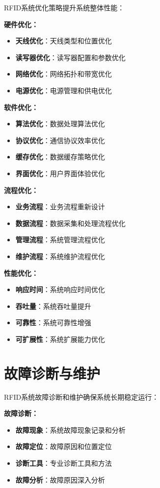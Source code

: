 \documentclass[12pt,UTF8]{ctexbook}
\begin{document}
\begin{itemize}[leftmargin=3.5em]
\begin{itemize}[leftmargin=3.5em]
\begin{itemize}[leftmargin=3.5em]
\begin{itemize}[leftmargin=3.5em]
RFID系统优化策略提升系统整体性能：

\textbf{硬件优化：}
\begin{itemize}[leftmargin=3.5em]
    \item \textbf{天线优化}：天线类型和位置优化
    \item \textbf{读写器优化}：读写器配置和参数优化
    \item \textbf{网络优化}：网络拓扑和带宽优化
    \item \textbf{电源优化}：电源管理和供电优化
\end{itemize}

\textbf{软件优化：}
\begin{itemize}[leftmargin=3.5em]
    \item \textbf{算法优化}：数据处理算法优化
    \item \textbf{协议优化}：通信协议效率优化
    \item \textbf{缓存优化}：数据缓存策略优化
    \item \textbf{界面优化}：用户界面体验优化
\end{itemize}

\textbf{流程优化：}
\begin{itemize}[leftmargin=3.5em]
    \item \textbf{业务流程}：业务流程重新设计
    \item \textbf{数据流程}：数据采集和处理流程优化
    \item \textbf{管理流程}：系统管理流程优化
    \item \textbf{维护流程}：系统维护流程优化
\end{itemize}

\textbf{性能优化：}
\begin{itemize}[leftmargin=3.5em]
    \item \textbf{响应时间}：系统响应时间优化
    \item \textbf{吞吐量}：系统吞吐量提升
    \item \textbf{可靠性}：系统可靠性增强
    \item \textbf{可扩展性}：系统扩展能力优化
\end{itemize}

\section{故障诊断与维护}

RFID系统故障诊断和维护确保系统长期稳定运行：

\textbf{故障诊断：}
\begin{itemize}[leftmargin=3.5em]
    \item \textbf{故障现象}：系统故障现象记录和分析
    \item \textbf{故障定位}：故障原因和位置定位
    \item \textbf{诊断工具}：专业诊断工具和方法
    \item \textbf{故障分析}：故障原因深入分析
\end{itemize}


\end{itemize}
\end{itemize}
\end{itemize}
\end{itemize}
\end{document}
